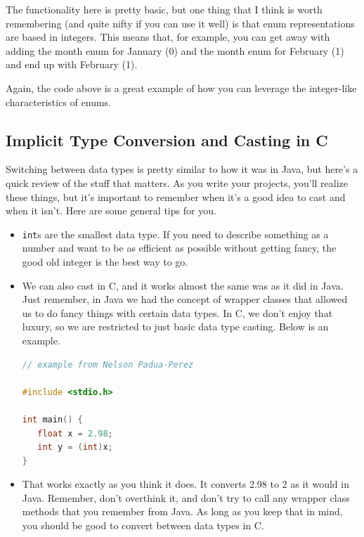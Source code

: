 \documentclass[english, 10pt]{article}
\begin{document}
The functionality here is pretty basic, but one thing that I think is worth remembering (and quite nifty if you can use it well) is that enum representations are based in integers. This means that, for example, you can get away with adding the month enum for January (0) and the month enum for February (1) and end up with February (1).\newline

Again, the code above is a great example of how you can leverage the integer-like characteristics of enums.

\subsection{Implicit Type Conversion and Casting in C}

Switching between data types is pretty similar to how it was in Java, but here's a quick review of the stuff that matters. As you write your projects, you'll realize these things, but it's important to remember when it's a good idea to cast and when it isn't. Here are some general tips for you.\newline

\begin{itemize}
	\item \texttt{int}s are the smallest data type. If you need to describe something as a number and want to be as efficient as possible without getting fancy, the good old integer is the best way to go.
	\item We can also cast in C, and it works almost the same was as it did in Java. Just remember, in Java we had the concept of wrapper classes that allowed us to do fancy things with certain data types. In C, we don't enjoy that luxury, so we are restricted to just basic data type casting. Below is an example.
	
	
	{\centering
\begin{lstlisting}[language=C]
// example from Nelson Padua-Perez

#include <stdio.h>                                                                    
                                                                                      
int main() {                                                                          
   float x = 2.98;
   int y = (int)x;
}
\end{lstlisting}
}

\item That works exactly as you think it does. It converts 2.98 to 2 as it would in Java. Remember, don't overthink it, and don't try to call any wrapper class methods that you remember from Java. As long as you keep that in mind, you should be good to convert between data types in C.
\end{itemize}
\end{document}
